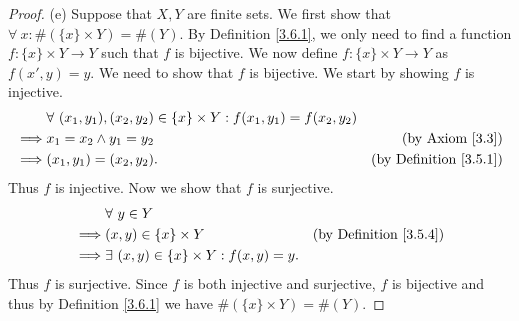 \begin{proof}{(e)}
    Suppose that \(X, Y\) are finite sets.
    We first show that \(\forall\ x : \#(\{x\} \times Y) = \#(Y)\).
    By Definition \ref{3.6.1}, we only need to find a function \(f : \{x\} \times Y \to Y\) such that \(f\) is bijective.
    We now define \(f : \{x\} \times Y \to Y\) as \(f(x', y) = y\).
    We need to show that \(f\) is bijective.
    We start by showing \(f\) is injective.
    \begin{align*}
                 & \forall\ (x_1, y_1), (x_2, y_2) \in \{x\} \times Y : f(x_1, y_1) = f(x_2, y_2)                                      \\
        \implies & x_1 = x_2 \land y_1 = y_2                                                      & \text{(by Axiom \ref{3.3})}        \\
        \implies & (x_1, y_1) = (x_2, y_2).                                                       & \text{(by Definition \ref{3.5.1})}
    \end{align*}
    Thus \(f\) is injective.
    Now we show that \(f\) is surjective.
    \begin{align*}
                 & \forall\ y \in Y                                                                       \\
        \implies & (x, y) \in \{x\} \times Y                         & \text{(by Definition \ref{3.5.4})} \\
        \implies & \exists\ (x, y) \in \{x\} \times Y : f(x, y) = y.
    \end{align*}
    Thus \(f\) is surjective.
    Since \(f\) is both injective and surjective, \(f\) is bijective and thus by Definition \ref{3.6.1} we have \(\#(\{x\} \times Y) = \#(Y)\).


\end{proof}
